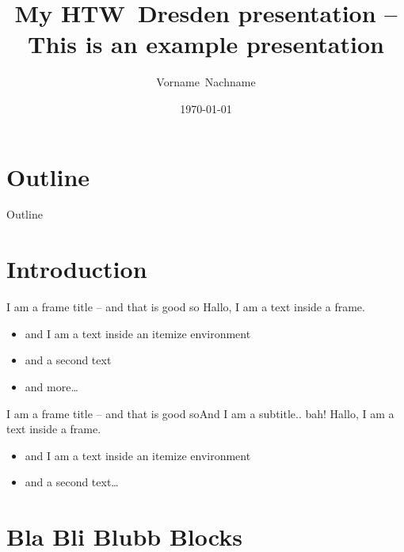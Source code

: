 \documentclass[]{beamer}
\title[My Presentation]{My HTW~Dresden presentation -- This is an example presentation}
\author[V.I.~Nachname]{Vorname~Nachname}
\institute[HTW~Dresden]{University of Applied Sciences Dresden}
\date{\today} %
\begin{document}
%
%

\frame[plain]{\titlepage}

%
%
\section*{Outline}

\begin{frame}{Outline}
	\tableofcontents[hideallsubsections]
\end{frame}

%
%
\section{Introduction}

\begin{frame}{\secname{}}
\end{frame}

\begin{frame}{I am a frame title -- and that is good so}
Hallo, I am a text inside a frame.

\vfill

\begin{itemize}
\item and I am a text inside an itemize environment
\item and a second text
\item and more\ldots
\end{itemize}
\end{frame}


\begin{frame}{I am a frame title -- and that is good so}{And I am a subtitle.. bah!}
Hallo, I am a text inside a frame.

\vfill

\begin{itemize}
\item and I am a text inside an itemize environment
\item and a second text\ldots
\end{itemize}
\end{frame}


%
%
\section{Bla Bli Blubb Blocks}

\begin{frame}{\secname{}}
\end{frame}
\end{document}
